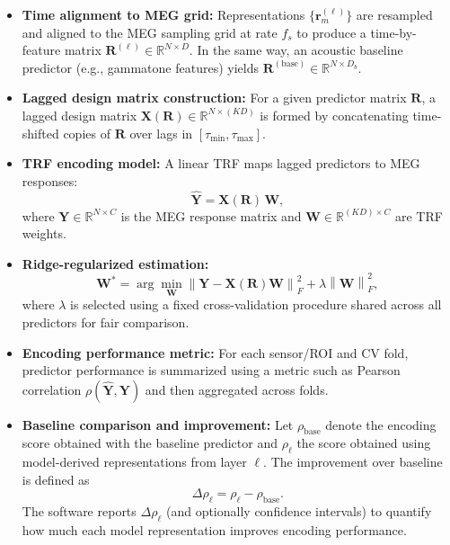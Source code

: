 \documentclass[12pt]{article}
\begin{document}
\begin{itemize}
  \item \textbf{Time alignment to MEG grid:} Representations $\{\boldsymbol{r}_m^{(\ell)}\}$ are resampled and aligned to the MEG sampling grid at rate $f_s$ to produce a time-by-feature matrix $\mathbf{R}^{(\ell)} \in \mathbb{R}^{N \times D}$.
  In the same way, an acoustic baseline predictor (e.g., gammatone features) yields $\mathbf{R}^{(\mathrm{base})}\in \mathbb{R}^{N\times D_b}$.

  \item \textbf{Lagged design matrix construction:} For a given predictor matrix $\mathbf{R}$, a lagged design matrix
  $\mathbf{X}(\mathbf{R}) \in \mathbb{R}^{N \times (K D)}$ is formed by concatenating time-shifted copies of $\mathbf{R}$
  over lags in $[\tau_{\min}, \tau_{\max}]$.

  \item \textbf{TRF encoding model:} A linear TRF maps lagged predictors to MEG responses:
  \[
    \hat{\mathbf{Y}} = \mathbf{X}(\mathbf{R})\,\mathbf{W},
  \]
  where $\mathbf{Y}\in \mathbb{R}^{N\times C}$ is the MEG response matrix and $\mathbf{W}\in \mathbb{R}^{(K D)\times C}$ are TRF weights.

  \item \textbf{Ridge-regularized estimation:}
  \[
    \mathbf{W}^\ast = \arg\min_{\mathbf{W}}
    \left\lVert \mathbf{Y} - \mathbf{X}(\mathbf{R})\mathbf{W} \right\rVert_F^2
    + \lambda \left\lVert \mathbf{W} \right\rVert_F^2,
  \]
  where $\lambda$ is selected using a fixed cross-validation procedure shared across all predictors for fair comparison.

  \item \textbf{Encoding performance metric:} For each sensor/ROI and CV fold, predictor performance is summarized using
  a metric such as Pearson correlation $\rho(\hat{\mathbf{Y}}, \mathbf{Y})$ and then aggregated across folds.

  \item \textbf{Baseline comparison and improvement:} Let $\rho_{\mathrm{base}}$ denote the encoding score obtained with the baseline predictor
  and $\rho_{\ell}$ the score obtained using model-derived representations from layer $\ell$. The improvement over baseline is defined as
  \[
    \Delta \rho_{\ell} = \rho_{\ell} - \rho_{\mathrm{base}}.
  \]
  The software reports $\Delta \rho_{\ell}$ (and optionally confidence intervals) to quantify how much each model representation improves encoding performance.
\end{itemize}
\end{document}
